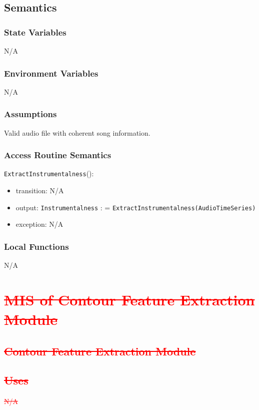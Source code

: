 \documentclass[12pt, titlepage]{article}
\begin{document}
\subsection{Semantics}

\subsubsection{State Variables}
N/A

\subsubsection{Environment Variables}
N/A

\subsubsection{Assumptions}
Valid audio file with coherent song information.

\subsubsection{Access Routine Semantics}

\noindent \texttt{ExtractInstrumentalness}():
\begin{itemize}
\item transition: N/A
\item output: \texttt{Instrumentalness} : = \texttt{ExtractInstrumentalness(Audio\textunderscore Time\textunderscore Series)}
\item exception: N/A
\end{itemize}

\subsubsection{Local Functions}
N/A

\section{\textcolor{red}{\sout{MIS of Contour Feature Extraction Module}}} 

\subsection{\textcolor{red}{\sout{Contour Feature Extraction Module}}}

\subsection{\textcolor{red}{\sout{Uses}}}
\textcolor{red}{\sout{N/A}}
\end{document}
